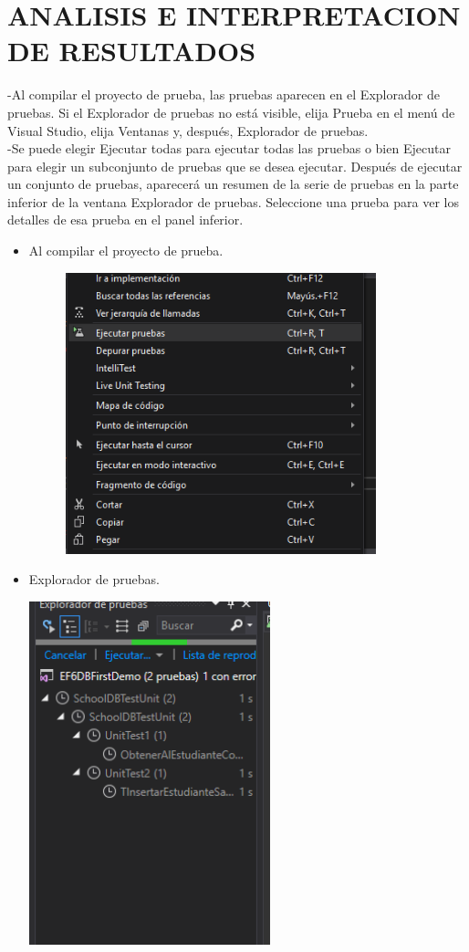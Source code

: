 \section{ANALISIS E INTERPRETACION DE RESULTADOS} 
-Al compilar el proyecto de prueba, las pruebas aparecen en el Explorador de pruebas. Si el Explorador de pruebas no está visible, elija Prueba en el menú de Visual Studio, elija Ventanas y, después, Explorador de pruebas.
\\-Se puede elegir Ejecutar todas para ejecutar todas las pruebas o bien Ejecutar para elegir un subconjunto de pruebas que se desea ejecutar. Después de ejecutar un conjunto de pruebas, aparecerá un resumen de la serie de pruebas en la parte inferior de la ventana Explorador de pruebas. Seleccione una prueba para ver los detalles de esa prueba en el panel inferior. 
\begin{itemize}
	\item Al compilar el proyecto de prueba.
	\begin{figure}[htb]
\begin{center}
\includegraphics[width=9cm]{./Imagenes/1-11}
\end{center}
\end{figure}
	\item Explorador de pruebas.
\begin{center}
\includegraphics[width=7cm]{./Imagenes/1-12}
\end{center}
\end{itemize}
